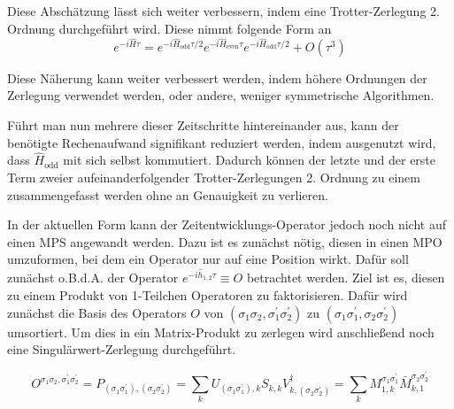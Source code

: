 \documentclass[10pt,a4paper]{report}
\begin{document}
Diese Abschätzung lässt sich weiter verbessern, indem eine Trotter-Zerlegung 2. Ordnung durchgeführt wird. Diese nimmt folgende Form an
\begin{equation}
e^{-i\hat{H}\tau}=e^{-i\hat{H}_{\text{odd}}\tau/2}e^{-i\hat{H}_{\text{even}}\tau}e^{-i\hat{H}_{\text{odd}}\tau/2}+O(\tau^3)
\end{equation}

Diese Näherung kann weiter verbessert werden, indem höhere Ordnungen der Zerlegung verwendet werden, oder andere, weniger symmetrische Algorithmen.

Führt man nun mehrere dieser Zeitschritte hintereinander aus, kann der benötigte Rechenaufwand signifikant reduziert werden, indem ausgenutzt wird, dass $\hat{H}_{\text{odd}}$ mit sich selbst kommutiert. Dadurch können der letzte und der erste Term zweier aufeinanderfolgender Trotter-Zerlegungen 2. Ordnung zu einem zusammengefasst werden ohne an Genauigkeit zu verlieren.\par

In der aktuellen Form kann der Zeitentwicklungs-Operator jedoch noch nicht auf einen MPS angewandt werden. Dazu ist es zunächst nötig, diesen in einen MPO umzuformen, bei dem ein Operator nur auf eine Position wirkt. Dafür soll zunächst o.B.d.A. der Operator $e^{-i\hat{h}_{1,2}\tau}\equiv O$ betrachtet werden. Ziel ist es, diesen zu einem Produkt von 1-Teilchen Operatoren zu faktorisieren. Dafür wird zunächst die Basis des Operators $O$ von $(\sigma_1\sigma_2,\sigma_1^{\prime}\sigma_2^{\prime})$ zu $(\sigma_1\sigma_1^{\prime},\sigma_2\sigma_2^{\prime})$ umsortiert. Um dies in ein Matrix-Produkt zu zerlegen wird anschließend noch eine Singulärwert-Zerlegung durchgeführt. 

\begin{equation}
O^{\sigma_1 \sigma_2,\sigma_1^\prime \sigma_2^\prime}=P_{(\sigma_1 \sigma_1^\prime),(\sigma_2 \sigma_2^\prime)}=\sum_k U_{(\sigma_1 \sigma_1^\prime),k}S_{k,k}V_{k,(\sigma_2 \sigma_2^\prime)}^\dagger=\sum_k M_{1,k}^{\sigma_1 \sigma_1^\prime} \bar{M}_{k,1}^{\sigma_2 \sigma_2^\prime}
\end{equation}
\end{document}
